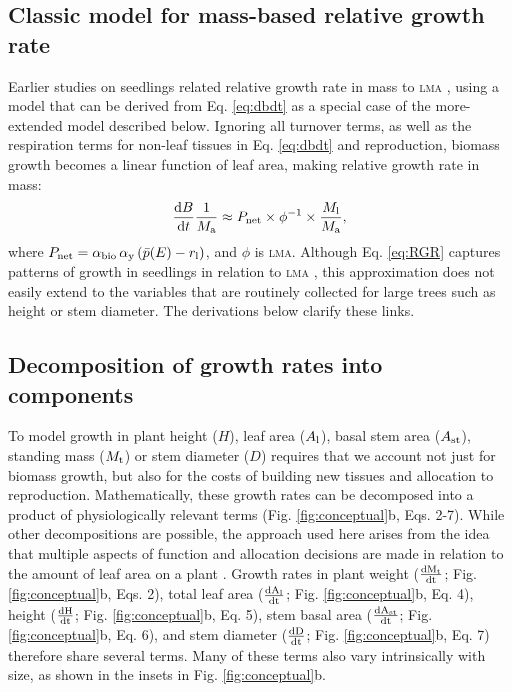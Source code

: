 \documentclass[9pt,twocolumn,twoside,lineno]{pnas-new}
\newcommand{\ud}{\ensuremath{\rm{d}}}
\newcommand{\lma}{\textsc{lma}}
\begin{document}
\subsection*{Classic model for mass-based relative growth rate}

Earlier studies on seedlings related relative growth rate in mass to {\lma} \citep{Blackman-1919, Lambers-1992, Cornelissen-1996, Wright-2000}, using a model that can be derived from Eq. \ref{eq:dbdt} as a special case of the more-extended model described below. Ignoring all turnover terms, as well as the respiration terms for non-leaf tissues in Eq. \ref{eq:dbdt} and reproduction, biomass growth becomes a linear function of leaf area, making relative growth rate in mass:
\begin{equation}\label{eq:RGR}
\frac{{\rm d}B}{{\rm d}t}\frac{1}{M_{\rm a}}  \approx P_{\rm net} \times \phi^{-1} \times \frac{M_{\rm l}}{M_{\rm a}}, \end{equation}
where $P_{\rm net} = \alpha_{\rm bio} \, \alpha_{\rm y}\,(\bar{p}(E) - r_{\rm l})$, and $\phi$ is {\lma}. Although Eq. \ref{eq:RGR} captures patterns of growth in seedlings in relation to {\lma} \citep{Wright-2000}, this approximation does not easily extend to the variables that are routinely collected for large trees such as height or stem diameter. The derivations below clarify these links.

\subsection*{Decomposition of growth rates into components}

To model growth in plant height ($H$), leaf area ($A_{\rm l}$), basal stem area ($ A_{\rm st}$), standing mass ($M_{\rm t}$) or stem diameter ($D$) requires that we account not just for biomass growth, but also for the costs of building new tissues and allocation to reproduction. Mathematically, these growth rates can be decomposed into a product of physiologically relevant terms \citep{Falster-2011, Gibert-2016} (Fig. \ref{fig:conceptual}b, Eqs. {\color{pnasbluetext}2}-{\color{pnasbluetext}7}). While other decompositions are possible, the approach used here arises from the idea that multiple aspects of function and allocation decisions are made in relation to the amount of leaf area on a plant  \citep{Falster-2011}. Growth rates in plant weight ($\frac{\ud M_{\rm t} }{\ud t}$; Fig. \ref{fig:conceptual}b, Eqs. {\color{pnasbluetext}2}), total leaf area ($\frac{\ud A_{\rm l}}{\ud t}$; Fig. \ref{fig:conceptual}b, Eq. {\color{pnasbluetext}4}), height ($\frac{\ud H}{\ud t}$; Fig. \ref{fig:conceptual}b, Eq. {\color{pnasbluetext}5}), stem basal area ($\frac{\ud  A_{\rm st}}{\ud t}$; Fig. \ref{fig:conceptual}b, Eq. {\color{pnasbluetext}6}), and stem diameter ($\frac{\ud D}{\ud t}$; Fig. \ref{fig:conceptual}b, Eq. {\color{pnasbluetext}7}) therefore share several terms. Many of these terms also vary intrinsically with size, as shown in the insets in Fig. \ref{fig:conceptual}b.
\end{document}
